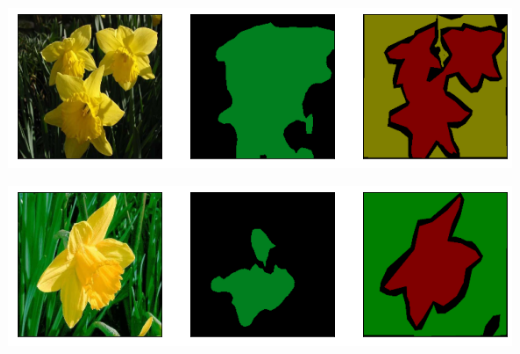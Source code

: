 \documentclass{article}
\begin{document}
\includegraphics[width=\textwidth]{D2-2.2.3.png}

\includegraphics[width=\textwidth]{D2-2.2.4.png}
\end{document}
